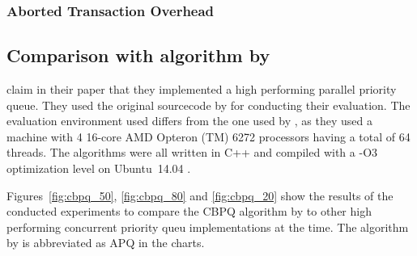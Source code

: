 \subsubsection{Aborted Transaction Overhead}

\subsection{Comparison with algorithm by \citeauthor{braginsky_cbpq:_2016}}

\citeauthor{braginsky_cbpq:_2016} claim in their paper that they implemented a high performing parallel priority queue. They used the original sourcecode by \citeauthor{calciu_adaptive_2014} for conducting their evaluation. The evaluation environment used differs from the one used by \citeauthor{calciu_adaptive_2014}, as they used a machine with 4 16-core AMD Opteron (TM) 6272 processors having a total of 64 threads. The algorithms were all written in C++ and compiled with a -O3 optimization level on Ubuntu~14.04 \cite{braginsky_cbpq:_2016}.

Figures~\ref{fig:cbpq_50}, \ref{fig:cbpq_80} and \ref{fig:cbpq_20} show the results of the conducted experiments to compare the CBPQ algorithm by \citeauthor{braginsky_cbpq:_2016} to other high performing concurrent priority queu implementations at the time. The algorithm by \citeauthor{calciu_adaptive_2014} is abbreviated as APQ in the charts.


